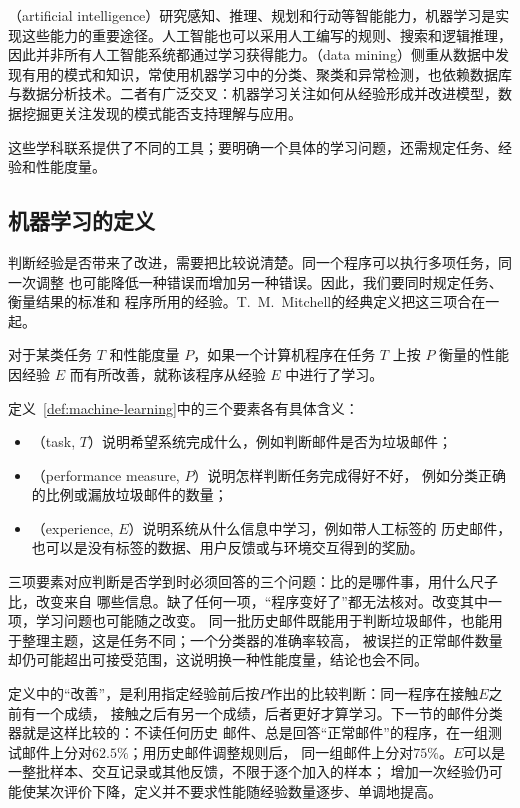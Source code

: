 （artificial intelligence）研究感知、推理、规划和行动等智能能力，机器学习是实现这些能力的重要途径。人工智能也可以采用人工编写的规则、搜索和逻辑推理，因此并非所有人工智能系统都通过学习获得能力。（data mining）侧重从数据中发现有用的模式和知识，常使用机器学习中的分类、聚类和异常检测，也依赖数据库与数据分析技术。二者有广泛交叉：机器学习关注如何从经验形成并改进模型，数据挖掘更关注发现的模式能否支持理解与应用。

这些学科联系提供了不同的工具；要明确一个具体的学习问题，还需规定任务、经验和性能度量。

\subsection{机器学习的定义}

判断经验是否带来了改进，需要把比较说清楚。同一个程序可以执行多项任务，同一次调整
也可能降低一种错误而增加另一种错误。因此，我们要同时规定任务、衡量结果的标准和
程序所用的经验。T.~M.~Mitchell的经典定义把这三项合在一起。

\begin{definition}[机器学习]
\label{def:machine-learning}
对于某类任务 $T$ 和性能度量 $P$，如果一个计算机程序在任务 $T$ 上按 $P$ 衡量的性能
因经验 $E$ 而有所改善，就称该程序从经验 $E$ 中进行了学习。
\end{definition}

定义~\ref{def:machine-learning}中的三个要素各有具体含义：

\begin{itemize}
  \item {}（task, $T$）说明希望系统完成什么，例如判断邮件是否为垃圾邮件；
  \item {}（performance measure, $P$）说明怎样判断任务完成得好不好，
    例如分类正确的比例或漏放垃圾邮件的数量；
  \item {}（experience, $E$）说明系统从什么信息中学习，例如带人工标签的
    历史邮件，也可以是没有标签的数据、用户反馈或与环境交互得到的奖励。
\end{itemize}

三项要素对应判断是否学到时必须回答的三个问题：比的是哪件事，用什么尺子比，改变来自
哪些信息。缺了任何一项，“程序变好了”都无法核对。改变其中一项，学习问题也可能随之改变。
同一批历史邮件既能用于判断垃圾邮件，也能用于整理主题，这是任务不同；一个分类器的准确率较高，
被误拦的正常邮件数量却仍可能超出可接受范围，这说明换一种性能度量，结论也会不同。

定义中的“改善”，是利用指定经验前后按$P$作出的比较判断：同一程序在接触$E$之前有一个成绩，
接触之后有另一个成绩，后者更好才算学习。下一节的邮件分类器就是这样比较的：不读任何历史
邮件、总是回答“正常邮件”的程序，在一组测试邮件上分对$62.5\%$；用历史邮件调整规则后，
同一组邮件上分对$75\%$。$E$可以是一整批样本、交互记录或其他反馈，不限于逐个加入的样本；
增加一次经验仍可能使某次评价下降，定义并不要求性能随经验数量逐步、单调地提高。


